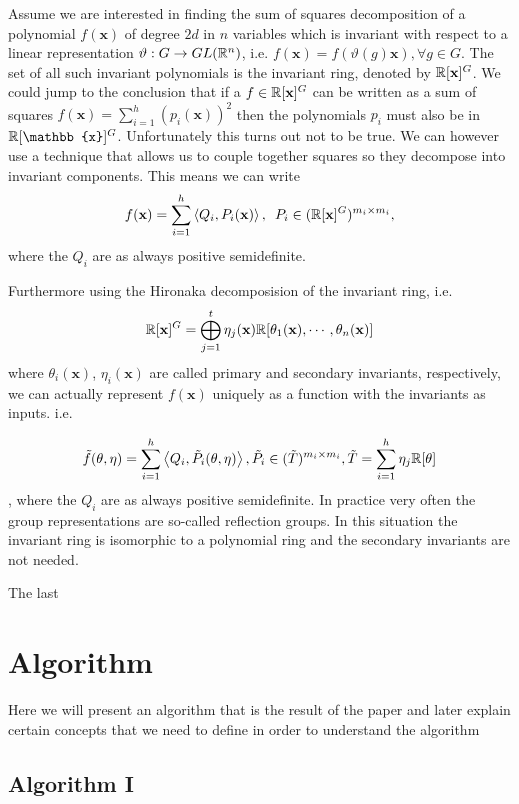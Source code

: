 \documentclass[]{article}
\begin{document}
Assume we are interested in finding the sum of squares decomposition of a polynomial $f(\textbf{x})$ of degree $2d$ in $n$
variables which is invariant with respect to a linear representation $\vartheta:G\rightarrow GL(\mathbb R^n)$, i.e. $f(\textbf{x}) = f(\vartheta(g)\textbf{x}), \forall g\in G$.
The set of all such invariant polynomials is the invariant ring, denoted by $\mathbb R[\textbf{x}]^G$. We could jump to the conclusion that if a $f\in \mathbb R[\textbf{x}]^G$ can be written as a 
sum of squares $f(\textbf{x}) =\sum_{i=1}^{h}(p_i(\textbf{x}))^2$ then the polynomials $p_i$ must also be in $\R[\mathbb{x}]^G$. Unfortunately this turns out not to be true. We can however
use a technique that allows us to couple together squares so they decompose into invariant components. This means we can write 
\[f(\textbf{x}) = \sum_{i=1}^{h}\left<Q_i,P_i(\mathbf{x})\right>, \,\,\, P_i\in (\mathbb R[\mathbf{x}]^G)^{m_i\times m_i},\]
where the $Q_i$ are as always positive semidefinite.


Furthermore using the Hironaka decomposision of the invariant ring, i.e.
\[\mathbb R[\mathbf{x}]^G = \bigoplus_{j=1}^{t}\eta_j(\textbf{x})\mathbb R[\theta_1(\textbf{x}), \cdots, \theta_n(\mathbf{x})]\] 
where $\theta_i(\mathbf{x})$, $\eta_i(\mathbf{x})$ are called primary and secondary invariants, respectively, 
we can actually represent $f(\mathbf{x})$ uniquely as a function with the invariants as inputs. i.e.

\[\tilde{f}(\theta,\eta) = \sum_{i=1}^{h}\left<Q_i,\tilde{P}_i(\theta,\eta)\right>, \tilde{P_i} \in (\tilde{T})^{m_i\times m_i}, \tilde{T} = \sum_{i=1}^{h}\eta_j\mathbb R[\theta]\],
where the $Q_i$ are as always positive semidefinite.
In practice very often the group representations are so-called reflection groups. In this situation the invariant ring is 
isomorphic to a polynomial ring and the secondary invariants are not needed.

The last 



\section{Algorithm}
Here we will present an algorithm that is the result of the paper and later explain certain concepts that we need to define in order to understand the algorithm

\subsection*{Algorithm I}
\end{document}

